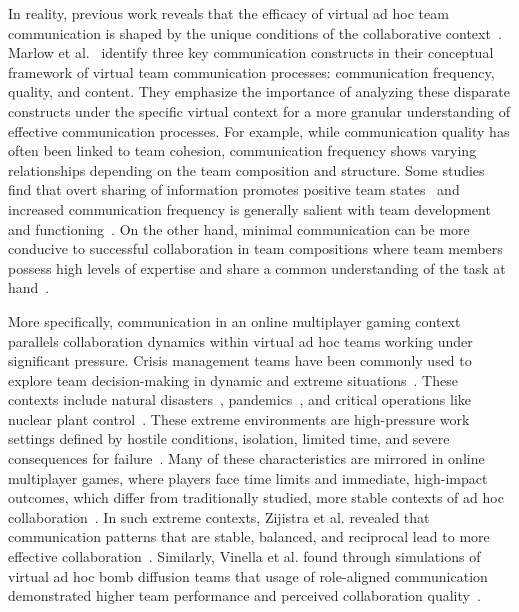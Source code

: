 In reality, previous work reveals that the efficacy of virtual ad hoc team communication is shaped by the unique conditions of the collaborative context~\cite{marlow2017, mesmer2009}. Marlow et al.~\cite{marlow2017} identify three key communication constructs in their conceptual framework of virtual team communication processes: communication frequency, quality, and content. They emphasize the importance of analyzing these disparate constructs under the specific virtual context for a more granular understanding of effective communication processes. For example, while communication quality has often been linked to team cohesion, communication frequency shows varying relationships depending on the team composition and structure. Some studies find that overt sharing of information promotes positive team states~\cite{mesmer2009} and increased communication frequency is generally salient with team development and functioning~\cite{monge2003}. On the other hand, minimal communication can be more conducive to successful collaboration in team compositions where team members possess high levels of expertise and share a common understanding of the task at hand~\cite{entin1999}.

More specifically, communication in an online multiplayer gaming context parallels collaboration dynamics within virtual ad hoc teams working under significant pressure. Crisis management teams have been commonly used to explore team decision-making in dynamic and extreme situations~\cite{uitdewilligen2018crisis, altschuller2008potential}. These contexts include natural disasters~\cite{longstaff2008natural}, pandemics~\cite{white2020covid}, and critical operations like nuclear plant control~\cite{stachowski2009crises}. These extreme environments are high-pressure work settings defined by hostile conditions, isolation, limited time, and severe consequences for failure~\cite{harrison1984exotic, bell2016extreme}. Many of these characteristics are mirrored in online multiplayer games, where players face time limits and immediate, high-impact outcomes, which differ from traditionally studied, more stable contexts of ad hoc collaboration~\cite{musick2021cognition}. In such extreme contexts, Zijistra et al. revealed that communication patterns that are stable, balanced, and reciprocal lead to more effective collaboration~\cite{zijlstra2012interaction}. Similarly, Vinella et al. found through simulations of virtual ad hoc bomb diffusion teams that usage of role-aligned communication demonstrated higher team performance and perceived collaboration quality~\cite{vinella2022personality}.

